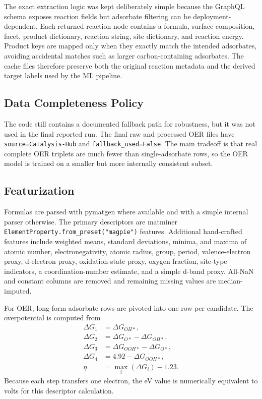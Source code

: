 \documentclass[conference]{IEEEtran}
\begin{document}
The exact extraction logic was kept deliberately simple because the GraphQL schema exposes reaction fields but adsorbate filtering can be deployment-dependent. Each returned reaction node contains a formula, surface composition, facet, product dictionary, reaction string, site dictionary, and reaction energy. Product keys are mapped only when they exactly match the intended adsorbates, avoiding accidental matches such as larger carbon-containing adsorbates. The cache files therefore preserve both the original reaction metadata and the derived target labels used by the ML pipeline.

\subsection{Data Completeness Policy}
The code still contains a documented fallback path for robustness, but it was not used in the final reported run. The final raw and processed OER files have \texttt{source=Catalysis-Hub} and \texttt{fallback\_used=False}. The main tradeoff is that real complete OER triplets are much fewer than single-adsorbate rows, so the OER model is trained on a smaller but more internally consistent subset.

\subsection{Featurization}
Formulas are parsed with pymatgen where available and with a simple internal parser otherwise. The primary descriptors are matminer \texttt{ElementProperty.from\_preset("magpie")} features. Additional hand-crafted features include weighted means, standard deviations, minima, and maxima of atomic number, electronegativity, atomic radius, group, period, valence-electron proxy, d-electron proxy, oxidation-state proxy, oxygen fraction, site-type indicators, a coordination-number estimate, and a simple d-band proxy. All-NaN and constant columns are removed and remaining missing values are median-imputed.

For OER, long-form adsorbate rows are pivoted into one row per candidate. The overpotential is computed from
\begin{align}
\Delta G_1 &= \Delta G_{OH*},\\
\Delta G_2 &= \Delta G_{O*} - \Delta G_{OH*},\\
\Delta G_3 &= \Delta G_{OOH*} - \Delta G_{O*},\\
\Delta G_4 &= 4.92 - \Delta G_{OOH*},\\
\eta &= \max_i(\Delta G_i) - 1.23.
\end{align}
Because each step transfers one electron, the eV value is numerically equivalent to volts for this descriptor calculation.
\end{document}
